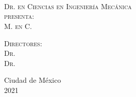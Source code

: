 \begin{titlepage}
\begin{minipage}[c][0.81\textheight][t]{0.75\textwidth}
\begin{center}
      {\color{red}{\large\scshape Titulo de la Tesis }}\\[.2in]

      \vspace{2cm}            

      
      \\[1.2cm]
      \\[0.8cm]
      \textsc{\large Dr. en Ciencias en Ingeniería Mecánica}\\[0.7cm]
      
      {\color{black}\textsc{\large presenta:}}\\[0.5cm]
      \textsc{\large {M. en C.}}\\[1cm]          

      \vspace{0.5cm}
      

      {\normalsize\scshape 
        {\color{black}Directores:}\\[0.3cm] {Dr.  \\ 
          Dr. }}\\[.2in]

      \vspace{1cm}

      \large{Ciudad de México\\
        2021}
    \end{center}
  \end{minipage}
\end{titlepage}
